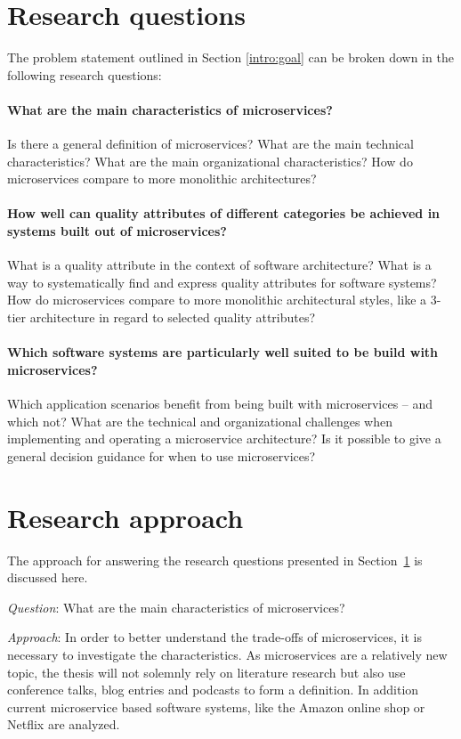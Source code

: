 \section{Research questions}
\label{intro:questions}
The problem statement outlined in Section \ref{intro:goal} can be broken down in the following research questions:

\paragraph{What are the main characteristics of microservices?}
Is there a general definition of microservices?
What are the main technical characteristics?
What are the main organizational characteristics?
How do microservices compare to more monolithic architectures?

\paragraph{How well can quality attributes of different categories be achieved in systems built out of microservices?}
What is a quality attribute in the context of software architecture?
What is a way to systematically find and express quality attributes for software systems?
How do microservices compare to more monolithic architectural styles, like a 3-tier architecture in regard to selected quality attributes?

\paragraph{Which software systems are particularly well suited to be build with microservices?}
Which application scenarios benefit from being built with microservices -- and which not?
What are the technical and organizational challenges when implementing and operating a microservice architecture?
Is it possible to give a general decision guidance for when to use microservices?

\section{Research approach}
\label{ther}
The approach for answering the research questions presented in Section~\ref{intro:questions} is discussed here.

\textit{Question}: What are the main characteristics of microservices?

\textit{Approach}:
In order to better understand the trade-offs of microservices, it is necessary to investigate the characteristics.
As microservices are a relatively new topic, the thesis will not solemnly rely on literature research but also use conference talks, blog entries and podcasts to form a definition.
In addition current microservice based software systems, like the Amazon online shop or Netflix are analyzed.

